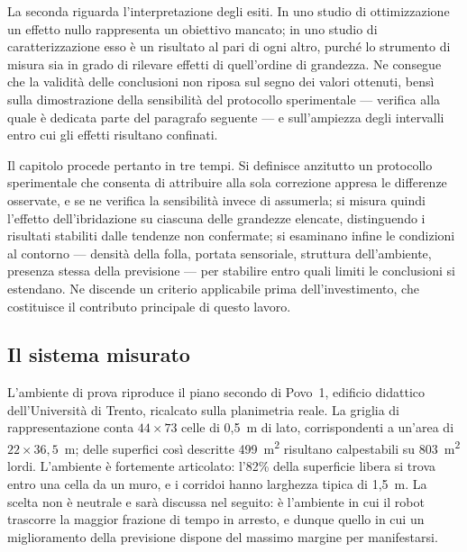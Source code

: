 La seconda riguarda l'interpretazione degli esiti. In uno studio di ottimizzazione un
effetto nullo rappresenta un obiettivo mancato; in uno studio di caratterizzazione esso è
un risultato al pari di ogni altro, purché lo strumento di misura sia in grado di rilevare
effetti di quell'ordine di grandezza. Ne consegue che la validità delle conclusioni non
riposa sul segno dei valori ottenuti, bensì sulla dimostrazione della sensibilità del
protocollo sperimentale --- verifica alla quale è dedicata parte del paragrafo seguente ---
e sull'ampiezza degli intervalli entro cui gli effetti risultano confinati.

Il capitolo procede pertanto in tre tempi. Si definisce anzitutto un protocollo
sperimentale che consenta di attribuire alla sola correzione appresa le differenze
osservate, e se ne verifica la sensibilità invece di assumerla; si misura quindi l'effetto
dell'ibridazione su ciascuna delle grandezze elencate, distinguendo i risultati stabiliti
dalle tendenze non confermate; si esaminano infine le condizioni al contorno --- densità
della folla, portata sensoriale, struttura dell'ambiente, presenza stessa della previsione
--- per stabilire entro quali limiti le conclusioni si estendano. Ne discende un criterio
applicabile prima dell'investimento, che costituisce il contributo principale di questo
lavoro.


\subsection{Il sistema misurato}

L'ambiente di prova riproduce il piano secondo di Povo~1, edificio didattico
dell'Università di Trento, ricalcato sulla planimetria reale. La griglia di
rappresentazione conta $44 \times 73$ celle di 0,5~m di lato, corrispondenti a un'area di
$22 \times 36{,}5$~m; delle superfici così descritte 499~m\textsuperscript{2} risultano
calpestabili su 803~m\textsuperscript{2} lordi. L'ambiente è fortemente articolato:
l'82\% della superficie libera si trova entro una cella da un muro, e i corridoi hanno
larghezza tipica di 1,5~m. La scelta non è neutrale e sarà discussa nel seguito: è
l'ambiente in cui il robot trascorre la maggior frazione di tempo in arresto, e dunque
quello in cui un miglioramento della previsione dispone del massimo margine per
manifestarsi.

